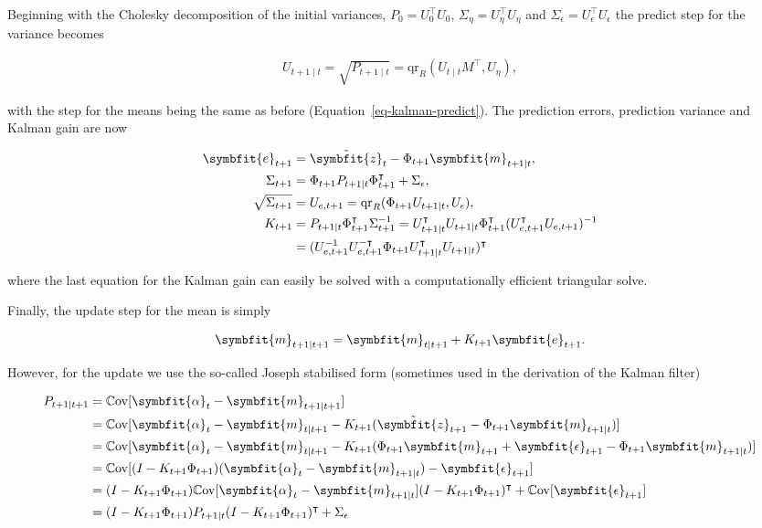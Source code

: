 \documentclass[
]{report}
\newcommand{\bv}[1]{\symbfit{#1}}
\theoremstyle{plain}
\theoremstyle{plain}
\theoremstyle{plain}
\theoremstyle{remark}
\begin{document}
Beginning with the Cholesky decomposition of the initial variances,
\(P_0 = U_0^\intercal U_0\),
\(\Sigma_{\eta} = U_{\eta}^\intercal U_{\eta}\) and
\(\Sigma_\epsilon = U_{\epsilon}^\intercal U_{\epsilon}\) the predict
step for the variance becomes

\[\begin{split}
U_{t+1\mid t} = \sqrt{P_{t+1\mid t}} = \mathrm{qr}_R(U_{t\mid t} M^\intercal, U_{\eta}),
\end{split}
\]

with the step for the means being the same as before
(Equation~\ref{eq-kalman-predict}). The prediction errors, prediction
variance and Kalman gain are now

\[\begin{split}
  \bv e_{t+1} &= \tilde{\bv z}_t - \Phi_{t+1} \bv m_{t+1\mid t},\\
  \Sigma_{t+1} &= \Phi_{t+1} P_{t+1\mid t} \Phi_{t+1}^\intercal + \Sigma_\epsilon,\\
  \sqrt{\Sigma_{t+1}} &= U_{e, t+1} = \mathrm{qr}_R(\Phi_{t+1} U_{t+1\mid t}, U_\epsilon),\\
  K_{t+1} &= P_{t+1\mid t} \Phi_{t+1}^\intercal \Sigma_{t+1}^{-1} = U_{t+1\mid t}^\intercal U_{t+1\mid t} \Phi_{t+1}^\intercal (U_{e, t+1}^\intercal U_{e, t+1})^{-1}\\
  &= (U_{e, t+1}^{-1}U_{e, t+1}^{-\intercal}\Phi_{t+1}U_{t+1\mid t}^\intercal U_{t+1\mid t})^\intercal
\end{split}
\]

where the last equation for the Kalman gain can easily be solved with a
computationally efficient triangular solve.

Finally, the update step for the mean is simply

\[\begin{split}
  \bv m_{t+1\mid t+1} = \bv m_{t \mid t+1} + K_{t+1} {\bv e_{t+1}}.
\end{split}
\]

However, for the update we use the so-called Joseph stabilised form
(sometimes used in the derivation of the Kalman filter)

\[\begin{split}
  P_{t+1\mid t+1} &= \mathbb C\mathrm{ov}[\bv \alpha_t - \bv m_{t+1\mid t+1}]\\
             &= \mathbb C\mathrm{ov}[\bv \alpha_t - \bv m_{t \mid t+1} - K_{t+1} (\tilde{\bv z}_{t+1} - \Phi_{t+1} \bv m_{t+1\mid t})]\\
             &= \mathbb C\mathrm{ov}[\bv \alpha_t - \bv m_{t \mid t+1} - K_{t+1} (\Phi_{t+1} \bv m_{t+1} + \bv \epsilon_{t+1} - \Phi_{t+1}\bv m_{t+1\mid t})]\\
             &= \mathbb C\mathrm{ov}[(I - K_{t+1} \Phi_{t+1})(\bv \alpha_t - \bv m_{t+1 \mid t}) - \bv \epsilon_{t+1}]\\
             &= (I - K_{t+1} \Phi_{t+1}) \mathbb C\mathrm{ov}[\bv \alpha_t - \bv m_{t+1 \mid t}](I - K_{t+1} \Phi_{t+1})^\intercal + \mathbb C\mathrm{ov}[\bv \epsilon_{t+1}]\\
             &= (I - K_{t+1} \Phi_{t+1}) P_{t+1\mid t}(I - K_{t+1} \Phi_{t+1})^\intercal + \Sigma_{\epsilon}
\end{split}
\]
\end{document}
